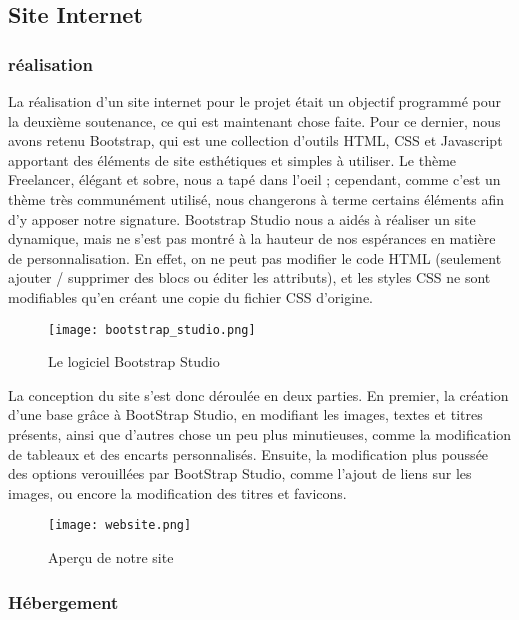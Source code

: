 \subsection{Site Internet}

    \subsubsection{réalisation}

    La réalisation d'un site internet pour le projet était un objectif
    programmé pour la deuxième soutenance, ce qui est maintenant chose faite.
    Pour ce dernier, nous avons retenu Bootstrap, qui est une collection
    d'outils HTML, CSS et Javascript apportant des éléments de site
    esthétiques et simples à utiliser. Le thème Freelancer, élégant et sobre,
    nous a tapé dans l'oeil ; cependant, comme c'est un thème très 
    communément utilisé, nous changerons à terme certains éléments afin 
    d'y apposer notre signature. Bootstrap Studio nous a aidés à réaliser
    un site dynamique, mais ne s'est pas montré à la hauteur de nos espérances
    en matière de personnalisation. En effet, on ne peut pas modifier
    le code HTML (seulement ajouter / supprimer des blocs ou éditer les
    attributs), et les styles CSS ne sont modifiables qu'en créant une copie
    du fichier CSS d'origine.

    \begin{figure}[hbt!]
        \centering
        \texttt{[image: bootstrap\_studio.png]}
        \caption{Le logiciel Bootstrap Studio}
    \end{figure}

    La conception du site s'est donc déroulée en deux parties. En premier, la création
    d'une base grâce à BootStrap Studio, en modifiant les images, textes et titres présents, ainsi
    que d'autres chose un peu plus minutieuses, comme la modification de tableaux et des encarts personnalisés.
    Ensuite, la modification plus poussée des options verouillées par BootStrap Studio, comme l'ajout de liens 
    sur les images, ou encore la modification des titres et favicons.

    \begin{figure}[hbt!]
        \centering
        \texttt{[image: website.png]}
        \caption{Aperçu de notre site}
    \end{figure}


    \subsubsection{Hébergement}

